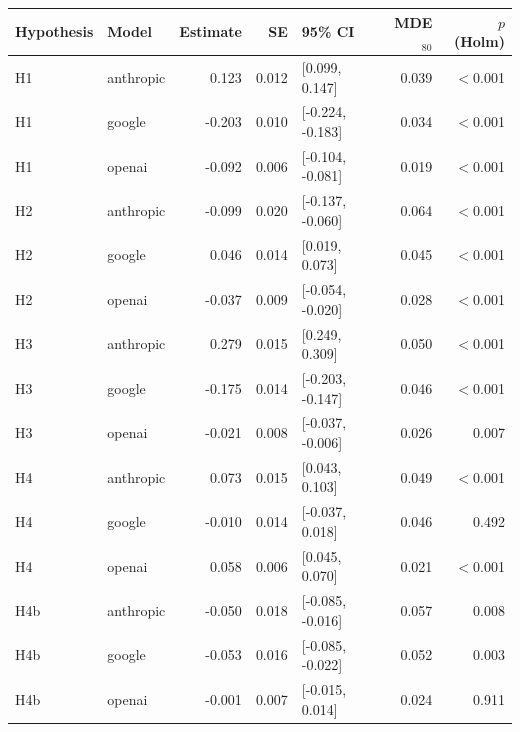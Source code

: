 \begin{tabular}{llrrlrr}
\toprule
Hypothesis & Model & Estimate & SE & 95\% CI & MDE$_{80}$ & $p$ (Holm) \\
\midrule
H1 & anthropic & 0.123 & 0.012 & [0.099, 0.147] & 0.039 & $<$0.001 \\
H1 & google & -0.203 & 0.010 & [-0.224, -0.183] & 0.034 & $<$0.001 \\
H1 & openai & -0.092 & 0.006 & [-0.104, -0.081] & 0.019 & $<$0.001 \\
H2 & anthropic & -0.099 & 0.020 & [-0.137, -0.060] & 0.064 & $<$0.001 \\
H2 & google & 0.046 & 0.014 & [0.019, 0.073] & 0.045 & $<$0.001 \\
H2 & openai & -0.037 & 0.009 & [-0.054, -0.020] & 0.028 & $<$0.001 \\
H3 & anthropic & 0.279 & 0.015 & [0.249, 0.309] & 0.050 & $<$0.001 \\
H3 & google & -0.175 & 0.014 & [-0.203, -0.147] & 0.046 & $<$0.001 \\
H3 & openai & -0.021 & 0.008 & [-0.037, -0.006] & 0.026 & 0.007 \\
H4 & anthropic & 0.073 & 0.015 & [0.043, 0.103] & 0.049 & $<$0.001 \\
H4 & google & -0.010 & 0.014 & [-0.037, 0.018] & 0.046 & 0.492 \\
H4 & openai & 0.058 & 0.006 & [0.045, 0.070] & 0.021 & $<$0.001 \\
H4b & anthropic & -0.050 & 0.018 & [-0.085, -0.016] & 0.057 & 0.008 \\
H4b & google & -0.053 & 0.016 & [-0.085, -0.022] & 0.052 & 0.003 \\
H4b & openai & -0.001 & 0.007 & [-0.015, 0.014] & 0.024 & 0.911 \\
\bottomrule
\end{tabular}
